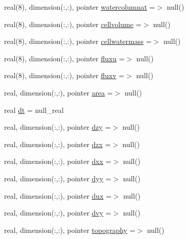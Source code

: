 \begin{DoxyCompactItemize}
real(8), dimension(\+:,\+:), pointer \mbox{\hyperlink{structmodulerunoffproperties_1_1t__extvar_aad8192003918a2fbfada20b9bc555d2f}{watercolumnat}} =$>$ null()
\item 
real(8), dimension(\+:,\+:), pointer \mbox{\hyperlink{structmodulerunoffproperties_1_1t__extvar_aaee8b1daf5928a2d1e191c1bddab5c1b}{cellvolume}} =$>$ null()
\item 
real(8), dimension(\+:,\+:), pointer \mbox{\hyperlink{structmodulerunoffproperties_1_1t__extvar_ac65b8d570a3393906d85caf528aff7a7}{cellwatermass}} =$>$ null()
\item 
real(8), dimension(\+:,\+:), pointer \mbox{\hyperlink{structmodulerunoffproperties_1_1t__extvar_a49ee2c743ce3111db17cedb960cffaff}{fluxu}} =$>$ null()
\item 
real(8), dimension(\+:,\+:), pointer \mbox{\hyperlink{structmodulerunoffproperties_1_1t__extvar_acf15322a2b545ebd55433ed338b3626a}{fluxv}} =$>$ null()
\item 
real, dimension(\+:,\+:), pointer \mbox{\hyperlink{structmodulerunoffproperties_1_1t__extvar_ae00437d688f50ab9dd135f11b0b3b51e}{area}} =$>$ null()
\item 
real \mbox{\hyperlink{structmodulerunoffproperties_1_1t__extvar_ae970a38e72f92a1cebe7432d7b2ebc77}{dt}} = null\+\_\+real
\item 
real, dimension(\+:,\+:), pointer \mbox{\hyperlink{structmodulerunoffproperties_1_1t__extvar_aa8e4fc7942bacefc2110b7ba3dcce113}{dzy}} =$>$ null()
\item 
real, dimension(\+:,\+:), pointer \mbox{\hyperlink{structmodulerunoffproperties_1_1t__extvar_a802e410bcf864ade6b7eff9b7496b7fc}{dzx}} =$>$ null()
\item 
real, dimension(\+:,\+:), pointer \mbox{\hyperlink{structmodulerunoffproperties_1_1t__extvar_a003360a2ce39404f97e4e2e097d2f3f8}{dxx}} =$>$ null()
\item 
real, dimension(\+:,\+:), pointer \mbox{\hyperlink{structmodulerunoffproperties_1_1t__extvar_a1ca345506cf6b8a93651466ba9cba86e}{dyy}} =$>$ null()
\item 
real, dimension(\+:,\+:), pointer \mbox{\hyperlink{structmodulerunoffproperties_1_1t__extvar_a870fa07e915999d6efe77a4c4df16bee}{dux}} =$>$ null()
\item 
real, dimension(\+:,\+:), pointer \mbox{\hyperlink{structmodulerunoffproperties_1_1t__extvar_aa337a0d45b4084ebd0cc2173766dbc56}{dvy}} =$>$ null()
\item 
real, dimension(\+:,\+:), pointer \mbox{\hyperlink{structmodulerunoffproperties_1_1t__extvar_a90753fd46f02d1ac65e00b8e6806cdd1}{topography}} =$>$ null()

\end{DoxyCompactItemize}
